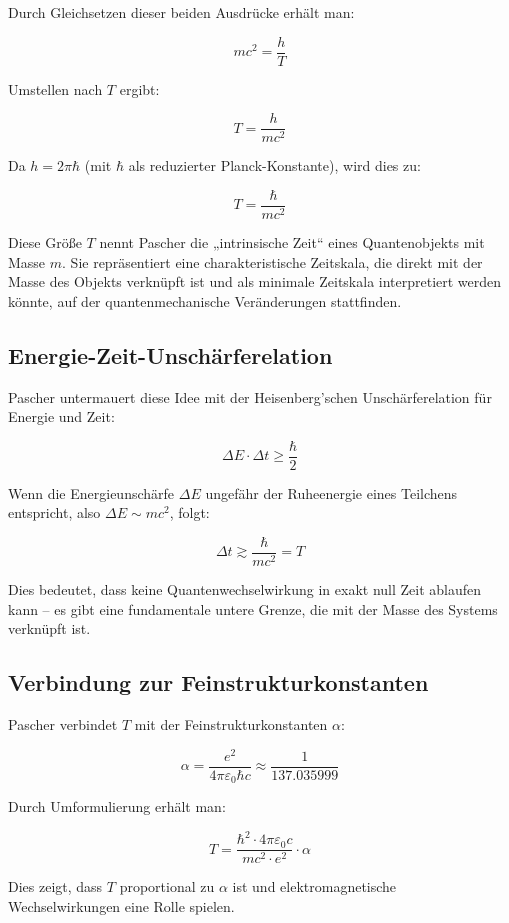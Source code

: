 \documentclass{article}
\begin{document}
	Durch Gleichsetzen dieser beiden Ausdrücke erhält man:
	
	\[
	mc^2 = \frac{h}{T}
	\]
	
	Umstellen nach \( T \) ergibt:
	
	\[
	T = \frac{h}{mc^2}
	\]
	
	Da \( h = 2\pi \hbar \) (mit \( \hbar \) als reduzierter Planck-Konstante), wird dies zu:
	
	\[
	T = \frac{\hbar}{mc^2}
	\]
	
	Diese Größe \( T \) nennt Pascher die „intrinsische Zeit“ eines Quantenobjekts mit Masse \( m \). Sie repräsentiert eine charakteristische Zeitskala, die direkt mit der Masse des Objekts verknüpft ist und als minimale Zeitskala interpretiert werden könnte, auf der quantenmechanische Veränderungen stattfinden.
	
	\subsection{Energie-Zeit-Unschärferelation}
	
	Pascher untermauert diese Idee mit der Heisenberg’schen Unschärferelation für Energie und Zeit:
	
	\[
	\Delta E \cdot \Delta t \geq \frac{\hbar}{2}
	\]
	
	Wenn die Energieunschärfe \( \Delta E \) ungefähr der Ruheenergie eines Teilchens entspricht, also \( \Delta E \sim mc^2 \), folgt:
	
	\[
	\Delta t \gtrsim \frac{\hbar}{mc^2} = T
	\]
	
	Dies bedeutet, dass keine Quantenwechselwirkung in exakt null Zeit ablaufen kann – es gibt eine fundamentale untere Grenze, die mit der Masse des Systems verknüpft ist.
	
	\subsection{Verbindung zur Feinstrukturkonstanten}
	
	Pascher verbindet \( T \) mit der Feinstrukturkonstanten \( \alpha \):
	
	\[
	\alpha = \frac{e^2}{4\pi \varepsilon_0 \hbar c} \approx \frac{1}{137.035999}
	\]
	
	Durch Umformulierung erhält man:
	
	\[
	T = \frac{\hbar^2 \cdot 4\pi \varepsilon_0 c}{mc^2 \cdot e^2} \cdot \alpha
	\]
	
	Dies zeigt, dass \( T \) proportional zu \( \alpha \) ist und elektromagnetische Wechselwirkungen eine Rolle spielen.
	
\end{document}
